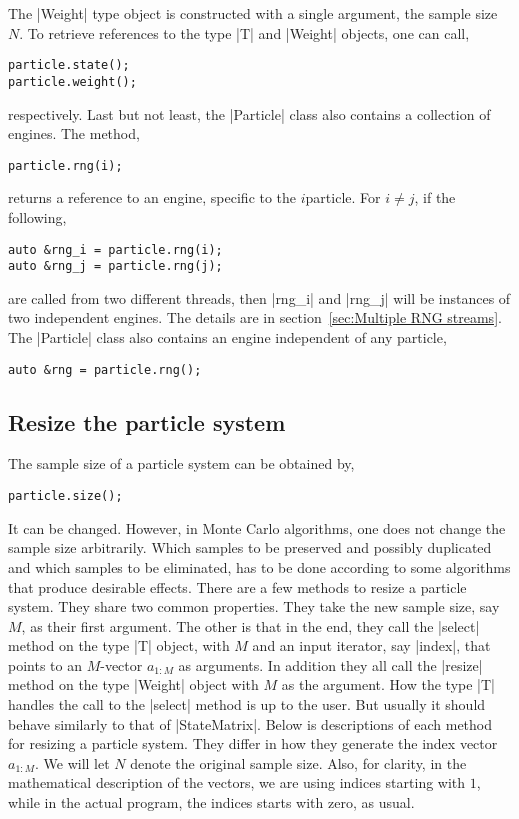 The |Weight| type object is constructed with a single argument, the sample size
$N$. To retrieve references to the type |T| and |Weight| objects, one can call,
\begin{verbatim}
particle.state();
particle.weight();
\end{verbatim}
respectively. Last but not least, the |Particle| class also contains a
collection of \rng engines. The method,
\begin{verbatim}
particle.rng(i);
\end{verbatim}
returns a reference to an \rng engine, specific to the $i$\ith particle. For $i
\ne j$, if the following,
\begin{verbatim}
auto &rng_i = particle.rng(i);
auto &rng_j = particle.rng(j);
\end{verbatim}
are called from two different threads, then |rng_i| and |rng_j| will be
instances of two independent \rng engines. The details are in
section~\ref{sec:Multiple RNG streams}. The |Particle| class also contains an
\rng engine independent of any particle,
\begin{verbatim}
auto &rng = particle.rng();
\end{verbatim}

\subsection{Resize the particle system}
\label{sub:Resize the particle system}

The sample size of a particle system can be obtained by,
\begin{verbatim}
particle.size();
\end{verbatim}
It can be changed. However, in Monte Carlo algorithms, one does not change the
sample size arbitrarily. Which samples to be preserved and possibly duplicated
and which samples to be eliminated, has to be done according to some algorithms
that produce desirable effects. There are a few methods to resize a particle
system. They share two common properties. They take the new sample size, say
$M$, as their first argument. The other is that in the end, they call the
|select| method on the type |T| object, with $M$ and an input iterator, say
|index|, that points to an $M$-vector $a_{1:M}$ as arguments. In addition they
all call the |resize| method on the type |Weight| object with $M$ as the
argument. How the type |T| handles the call to the |select| method is up to the
user. But usually it should behave similarly to that of |StateMatrix|. Below is
descriptions of each method for resizing a particle system. They differ in how
they generate the index vector $a_{1:M}$. We will let $N$ denote the original
sample size. Also, for clarity, in the mathematical description of the vectors,
we are using indices starting with $1$, while in the actual program, the
indices starts with zero, as usual.

